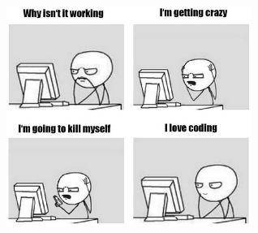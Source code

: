 \documentclass[
]{article}
\begin{document}
\centering

\includegraphics[width=0.6\textwidth,height=\textheight]{ilovecoding.JPG}
\end{document}
